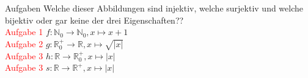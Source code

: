 \begin{frame}{Aufgaben}
	Welche dieser Abbildungen sind injektiv, welche surjektiv und welche bijektiv oder gar keine der drei Eigenschaften??\\
	\textcolor{red}{Aufgabe 1} $f:\mathbb{N}_0\longrightarrow\mathbb{N}_0, x\mapsto x+1$\\
	\textcolor{red}{Aufgabe 2} $g:\mathbb{R}_0^+\longrightarrow\mathbb{R}, x\mapsto\sqrt{\lvert x\rvert}$\\
	\textcolor{red}{Aufgabe 3} $h:\mathbb{R}\longrightarrow\mathbb{R}_0^+, x\mapsto\lvert x\rvert$\\
	\textcolor{red}{Aufgabe 3} $s:\mathbb{R}\longrightarrow\mathbb{R}^+, x\mapsto\lvert x\rvert$
\end{frame}
